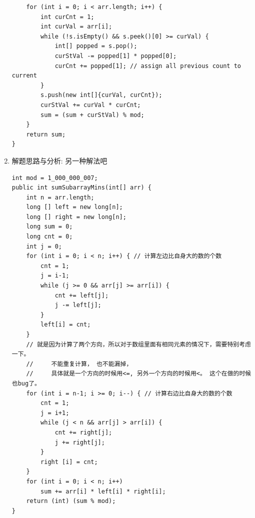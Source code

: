 \documentclass[9pt, b5paaper]{book}
\begin{document}
\begin{enumerate}
\begin{verbatim}
    for (int i = 0; i < arr.length; i++) {
        int curCnt = 1;
        int curVal = arr[i];
        while (!s.isEmpty() && s.peek()[0] >= curVal) {
            int[] popped = s.pop();
            curStVal -= popped[1] * popped[0];
            curCnt += popped[1]; // assign all previous count to current
        }
        s.push(new int[]{curVal, curCnt});
        curStVal += curVal * curCnt;
        sum = (sum + curStVal) % mod;
    }
    return sum;
}
\end{verbatim}
\item 解题思路与分析: 另一种解法吧
\label{sec-1-4-45-2}
\begin{verbatim}
int mod = 1_000_000_007;
public int sumSubarrayMins(int[] arr) {
    int n = arr.length;
    long [] left = new long[n];
    long [] right = new long[n];
    long sum = 0;
    long cnt = 0;
    int j = 0;
    for (int i = 0; i < n; i++) { // 计算左边比自身大的数的个数
        cnt = 1;
        j = i-1;
        while (j >= 0 && arr[j] >= arr[i]) {
            cnt += left[j];
            j -= left[j];
        }
        left[i] = cnt;
    }
    // 就是因为计算了两个方向，所以对于数组里面有相同元素的情况下，需要特别考虑一下。
    //     不能重复计算， 也不能漏掉，
    //     具体就是一个方向的时候用<=, 另外一个方向的时候用<。 这个在做的时候也bug了。
    for (int i = n-1; i >= 0; i--) { // 计算右边比自身大的数的个数
        cnt = 1;
        j = i+1;
        while (j < n && arr[j] > arr[i]) {
            cnt += right[j];
            j += right[j];
        }
        right [i] = cnt;
    }
    for (int i = 0; i < n; i++) 
        sum += arr[i] * left[i] * right[i];
    return (int) (sum % mod);
}
\end{verbatim}
\end{enumerate}
\end{document}
